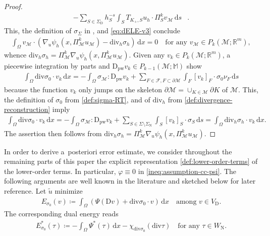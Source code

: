 \documentclass[a4paper]{amsart}
\numberwithin{equation}{section}
\newcommand{\R}{\mathbb{R}}
\renewcommand{\d}[1]{\,\mathrm{d}#1}
\renewcommand{\div}{\mathrm{div}}
\newcommand{\Fcal}{\mathcal{F}}
\newcommand{\Mcal}{\mathcal{M}}
\newcommand{\pw}{\mathrm{pw}}
\newcommand{\D}{\mathrm{D}}
\newcommand{\M}{\mathbb{M}}
\theoremstyle{remark}
\begin{document}
\begin{proof}
\begin{align*}
		- \sum_{S \in \Sigma_\mathrm{D}} h_S^{-s} \int_S T_{K_+,S} u_h \cdot \Pi_S^k v_\Mcal \d{s}&.
	\end{align*}
	This, the definition of $\sigma_\Sigma$ in , and \eqref{eq:dELE-v3} conclude	
	\begin{align*}
		\int_\Omega v_\Mcal \cdot (\nabla_u \psi_h(x,\Pi_\Mcal^k u_\Mcal) - \div_h \sigma_h) \d{x} = 0 \quad\text{for any } v_\Mcal \in P_k(\Mcal;\R^m),
	\end{align*}
	whence $\div_h \sigma_h = \Pi_\Mcal^k \nabla_u \psi_h(x,\Pi_\Mcal^k u_\Mcal)$.
	Given any $v_k \in P_k(\mathcal{M};\mathbb{R}^m)$, a piecewise integration by parts and $\D_\pw v_k \in P_{k-1}(\Mcal;\M)$ show
	\begin{align*}
		\int_\Omega \div \sigma_0 \cdot v_k \d{x} = - \int_\Omega \sigma_\Mcal : \D_\pw v_k + \sum_{F \in \Fcal, F \subset \partial \Mcal} \int_F [v_k]_F \cdot \sigma_0 \nu_F \d{s}
	\end{align*}
	because the function $v_k$ only jumps on the skeleton $\partial \Mcal = \cup_{K \in \Mcal} \partial K$ of $\mathcal{M}$.
	This, the definition of $\sigma_0$ from \eqref{def:sigma-RT}, and of $\div_h$ from \eqref{def:divergence-reconstruction} imply
	\begin{align*}
		\int_\Omega \div \sigma_0 \cdot v_k \d{x} = - \int_\Omega \sigma_\Mcal : \D_\pw v_k + \sum_{S \in \Sigma\setminus\Sigma_\mathrm{N}} \int_S [v_k]_S \cdot \sigma_S \d{s} = \int_\Omega \div_h \sigma_h \cdot v_k \d{x}.
	\end{align*}
	The assertion then follows from $\div_h \sigma_h = \Pi_\Mcal^k \nabla_u \psi_h(x, \Pi_\Mcal^k u_\Mcal)$.
\end{proof}
In order to derive a~posteriori error estimate, we consider throughout the remaining parts of this paper the explicit representation \eqref{def:lower-order-terms} of the lower-order terms.
In particular, $\varphi \equiv 0$ in \eqref{ineq:assumption-cc-psi}.
The following arguments are well known in the literature \cite{Repin2000,Bartels2015,CarstensenLiu2015,CarstensenTran2021,BartelsKaltenbach2023} and sketched below for later reference.
Let $\widetilde{u}$ minimize
\begin{align*}
	E_{\sigma_0}(v) \coloneqq \int_\Omega (\Psi(\D v) + \div \sigma_0 \cdot v) \d{x} \quad\text{among } v \in V_\mathrm{D}.
\end{align*}
The corresponding dual energy reads
\begin{align*}
	E_{\sigma_0}^*(\tau) \coloneqq - \int_\Omega \Psi^*(\tau) \d{x} - \chi_{\div \sigma_0}(\div \tau) \quad\text{for any } \tau \in W_\mathrm{N}.
\end{align*}
\end{document}
